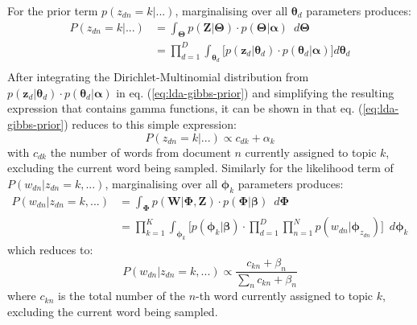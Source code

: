 For the prior term $p({z}_{dn}=k \vert ...)$, marginalising over all $\boldsymbol{\theta}_{d}$ parameters produces:
\begin{equation}
\begin{aligned}
P({z}_{dn}=k \vert ...) &= \int_{\boldsymbol{\Theta}}  p(\boldsymbol{Z} \vert \boldsymbol{\Theta}) \cdot p(\boldsymbol{\Theta} \vert \boldsymbol{\alpha}) \enspace d\boldsymbol{\Theta} \\
                                  &= \prod_{d=1}^{D} \int_{\boldsymbol{\theta}_d} \Bigg[ p(\boldsymbol{z}_{d} \vert \boldsymbol{\theta}_d) \cdot p(\boldsymbol{\theta}_d \vert \boldsymbol{\alpha}) \Bigg] d\boldsymbol{\theta}_d \\
\end{aligned}                                  
\label{eq:lda-gibbs-prior}
\end{equation}
After integrating the Dirichlet-Multinomial distribution from $p(\boldsymbol{z}_{d} \vert \boldsymbol{\theta}_d) \cdot p(\boldsymbol{\theta}_d \vert \boldsymbol{\alpha})$ in eq. (\ref{eq:lda-gibbs-prior}) and simplifying the resulting expression that contains gamma functions, it can be shown in \cite{carpenter2010integrating} that eq. (\ref{eq:lda-gibbs-prior}) reduces to this simple expression:
\begin{equation}
P({z}_{dn}=k \vert ...) \propto  c_{dk} + {\alpha}_k
\label{eq:lda-gibbs-prior-simple}
\end{equation}
with $c_{dk}$ the number of words from document $n$ currently assigned to topic $k$, excluding the current word being sampled. Similarly for the likelihood term of $P({w}_{dn} \vert {z}_{dn}=k, ...)$, marginalising over all $\boldsymbol{\phi}_k$ parameters produces:
\begin{equation}
\begin{aligned}
P({w}_{dn} \vert {z}_{dn}=k, ...) &= \int_{\boldsymbol{\Phi}} p(\boldsymbol{W} \vert \boldsymbol{\Phi}, \boldsymbol{Z}) \cdot p(\boldsymbol{\Phi} \vert \boldsymbol{\beta}) \enspace d\boldsymbol{\Phi} \\
                                                 &= \prod_{k=1}^{K} \int_{\boldsymbol{\phi}_k} \Bigg[ p(\boldsymbol{\phi}_k \vert \boldsymbol{\beta}) \cdot \prod_{d=1}^{D} \prod_{n=1}^{N} p(w_{dn} \vert \boldsymbol{\phi}_{z_{dn}}) \Bigg]\enspace d\boldsymbol{\phi}_k
\end{aligned}
\label{eq:lda-gibbs-likelihood}
\end{equation}
which reduces to:
\begin{equation}
P({w}_{dn} \vert {z}_{dn}=k, ...) \propto \frac{c_{kn} + {\beta}_n}{\sum_{n} c_{kn} + {\beta}_n}
\label{eq:lda-gibbs-likelihood-simple}
\end{equation}
where $c_{kn}$ is the total number of the $n$-th word currently assigned to topic $k$, excluding the current word being sampled.  

